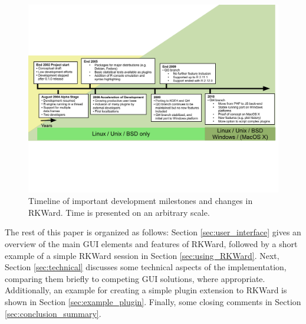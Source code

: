 \begin{figure}[htp]
 \centering
 \includegraphics[clip=true,trim=0cm 5.7cm 0cm 5.7cm,width=16cm]{../figures/timeline.pdf}
 \caption{Timeline of important development milestones and changes in RKWard.
          Time is presented on an arbitrary scale.}
 \label{fig:timeline}
\end{figure}

The rest of this paper is organized as follows: Section \ref{sec:user_interface} gives an 
overview of the main GUI elements and features of RKWard, followed by a short example 
of a simple RKWard session in Section \ref{sec:using_RKWard}.
Next, Section \ref{sec:technical} discusses some technical aspects of the implementation, comparing them briefly to competing GUI solutions, where appropriate. Additionally,
an example for creating a simple plugin extension to RKWard is shown in Section \ref{sec:example_plugin}.
Finally, some closing comments in Section \ref{sec:conclusion_summary}.
